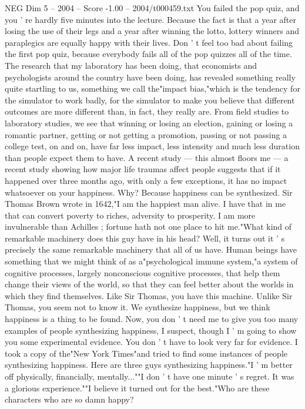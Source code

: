 \begin{textsample}{NEG Dim 5 – 2004 – Score -1.00 – 2004/t000459.txt}
You failed the pop quiz, and you ' re hardly five minutes into the lecture.
Because the fact is that a year after losing the use of their legs and a year after winning the lotto, lottery winners and paraplegics are equally happy with their lives.
Don ' t feel too bad about failing the first pop quiz, because everybody fails all of the pop quizzes all of the time.
The research that my laboratory has been doing, that economists and psychologists around the country have been doing, has revealed something really quite startling to us, something we call the"impact bias,"which is the tendency for the simulator to work badly, for the simulator to make you believe that different outcomes are more different than, in fact, they really are.
From field studies to laboratory studies, we see that winning or losing an election, gaining or losing a romantic partner, getting or not getting a promotion, passing or not passing a college test, on and on, have far less impact, less intensity and much less duration than people expect them to have.
A recent study — this almost floors me — a recent study showing how major life traumas affect people suggests that if it happened over three months ago, with only a few exceptions, it has no impact whatsoever on your happiness.
Why?
Because happiness can be synthesized.
Sir Thomas Brown wrote in 1642,"I am the happiest man alive.
I have that in me that can convert poverty to riches, adversity to prosperity.
I am more invulnerable than Achilles ; fortune hath not one place to hit me."What kind of remarkable machinery does this guy have in his head?
Well, it turns out it ' s precisely the same remarkable machinery that all of us have.
Human beings have something that we might think of as a"psychological immune system,"a system of cognitive processes, largely nonconscious cognitive processes, that help them change their views of the world, so that they can feel better about the worlds in which they find themselves.
Like Sir Thomas, you have this machine.
Unlike Sir Thomas, you seem not to know it.
We synthesize happiness, but we think happiness is a thing to be found.
Now, you don ' t need me to give you too many examples of people synthesizing happiness, I suspect, though I ' m going to show you some experimental evidence.
You don ' t have to look very far for evidence.
I took a copy of the"New York Times"and tried to find some instances of people synthesizing happiness.
Here are three guys synthesizing happiness."I ' m better off physically, financially, mentally...""I don ' t have one minute ' s regret.
It was a glorious experience.""I believe it turned out for the best."Who are these characters who are so damn happy?

\end{textsample}
